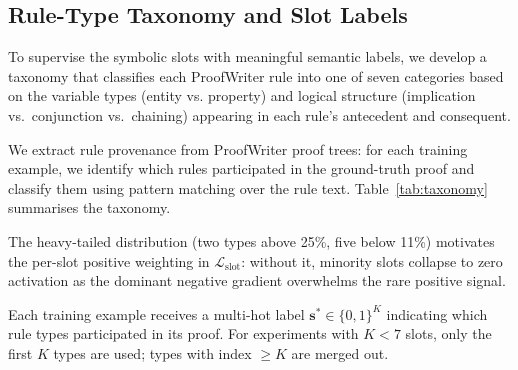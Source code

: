 \documentclass[conference]{IEEEtran}
\begin{document}
\subsection{Rule-Type Taxonomy and Slot Labels}
\label{sec:taxonomy}

To supervise the symbolic slots with meaningful semantic labels,
we develop a taxonomy that classifies each ProofWriter rule into
one of seven categories based on the variable types (entity vs.
property) and logical structure (implication vs.\ conjunction vs.\
chaining) appearing in each rule's antecedent and consequent.

We extract rule provenance from ProofWriter proof trees: for each
training example, we identify which rules participated in the
ground-truth proof and classify them using pattern matching over
the rule text.  Table~\ref{tab:taxonomy} summarises the
taxonomy.

\begin{table}[t]
\centering
\small
\caption{Rule-type taxonomy derived from ProofWriter rules.
\emph{Freq.}\ is the fraction of training examples where each
type appears in the proof.}
\label{tab:taxonomy}
\end{table}

The heavy-tailed distribution (two types above 25\%, five below
11\%) motivates the per-slot positive weighting in
$\mathcal{L}_\text{slot}$: without it, minority slots collapse to
zero activation as the dominant negative gradient overwhelms the
rare positive signal.

Each training example receives a multi-hot label
$\mathbf{s}^* \in \{0,1\}^K$ indicating which rule types
participated in its proof.  For experiments with $K < 7$ slots,
only the first $K$ types are used; types with index $\geq K$ are
merged out.
\end{document}
